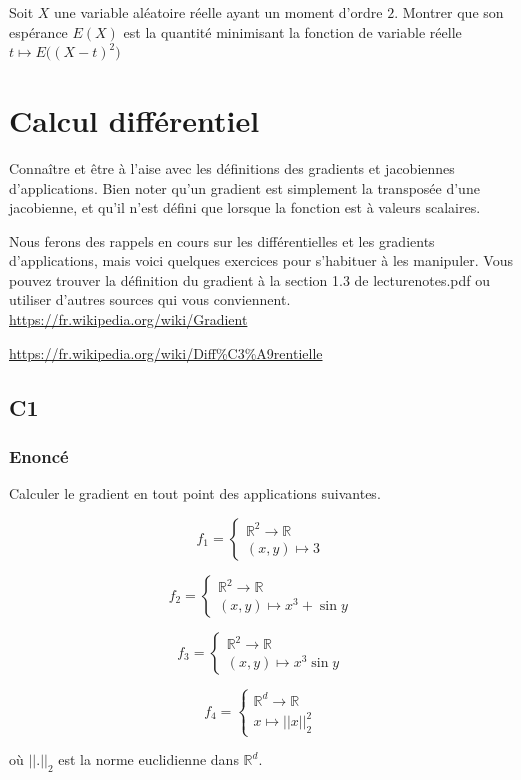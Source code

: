 \documentclass[
10pt, %
a4paper, %
oneside, %
headinclude,footinclude, %
BCOR5mm, %
]{scrartcl}
\begin{document}
Soit $X$ une variable aléatoire réelle ayant un moment d'ordre $2$. Montrer que
son espérance $E(X)$ est la quantité minimisant la fonction de variable réelle $t\mapsto E\big( (X-t)^2 \big)$

\section{\large\color{Blue}Calcul différentiel}

Connaître et être à l'aise avec les définitions des gradients et jacobiennes d'applications. Bien noter qu'un gradient est simplement la transposée d'une jacobienne, et qu'il n'est défini que lorsque la fonction est à valeurs scalaires.

Nous ferons des rappels en cours sur les différentielles et les gradients d'applications, mais voici quelques exercices pour s'habituer à les manipuler. Vous pouvez trouver la définition du gradient à la section 1.3 de lecture\textunderscore notes.pdf ou utiliser d'autres sources qui vous conviennent.
\\

\url{https://fr.wikipedia.org/wiki/Gradient} 

\url{https://fr.wikipedia.org/wiki/Diff%C3%A9rentielle} 
\\

\subsection{\color{MidnightBlue}C1}

\subsubsection{Enoncé}
\label{par:enoncé}


Calculer le gradient en tout point des applications suivantes.

$$
f_1 = \left\{
    \begin{array}{ll}
        \mathbb{R}^2 \rightarrow \mathbb{R}  \\
	(x,y)\mapsto 3
    \end{array}
\right.
$$

$$
f_2 = \left\{
    \begin{array}{ll}
        \mathbb{R}^2 \rightarrow \mathbb{R}  \\
	(x,y)\mapsto x^3+\sin y
    \end{array}
\right.
$$

$$
f_3 = \left\{
    \begin{array}{ll}
        \mathbb{R}^2 \rightarrow \mathbb{R}  \\
	(x,y)\mapsto x^3\sin y
    \end{array}
\right.
$$

$$
f_4 = \left\{
    \begin{array}{ll}
        \mathbb{R}^d \rightarrow \mathbb{R}  \\
	x\mapsto ||x||_2^2
    \end{array}
\right.
$$

où $||.||_2$ est la norme euclidienne dans $\mathbb{R}^d$.
\end{document}
